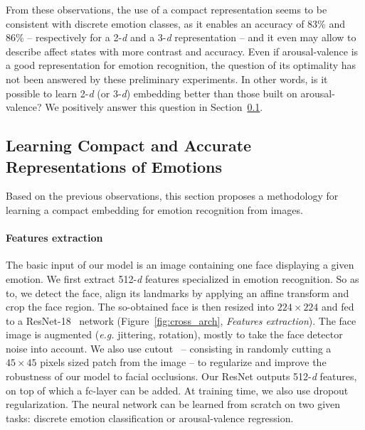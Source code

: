 \documentclass{bmvc2k}
\begin{document}
From these observations, the use of a compact representation seems to be consistent with discrete emotion classes, as it enables an accuracy of 83\% and 86\% -- respectively for a 2-\textit{d} and a 3-\textit{d} representation -- and it even may allow to describe affect states with more contrast and accuracy. 
Even if arousal-valence is a good representation for emotion recognition, the question of its optimality has not been answered by these preliminary experiments. In other words, is it possible to learn 2-\textit{d} (or 3-\textit{d}) embedding better than those built on arousal-valence? We positively answer this question in Section~\ref{subsec:method}. 

\subsection{Learning Compact and Accurate Representations of Emotions}
\label{subsec:method}
Based on the previous observations, this section proposes a methodology for learning a compact embedding for emotion recognition from images.
\paragraph{Features extraction}
The basic input of our model is an image containing one face displaying a given emotion. We first extract 512-\textit{d} features specialized in emotion recognition.
So as to, we detect the face, align its landmarks by applying an affine transform and crop the face region. The so-obtained face is then resized into $224\times224$ and fed to a ResNet-18~\cite{he_deep_2015} network (Figure~\ref{fig:cross_arch}, \textit{Features extraction}). The face image is augmented (\textit{e.g.} jittering, rotation), mostly to take the face detector noise into account. We also use cutout~\cite{devries_improved_2017} -- consisting in randomly cutting a $45\times45$ pixels sized patch from the image -- to regularize and improve the robustness of our model to facial occlusions.
Our ResNet outputs 512-\textit{d} features, on top of which a fc-layer can be added. At training time, we also use dropout~\cite{srivastava2014dropout} regularization.
The neural network can be learned from scratch on two given tasks: discrete emotion classification or arousal-valence regression. 
\end{document}
